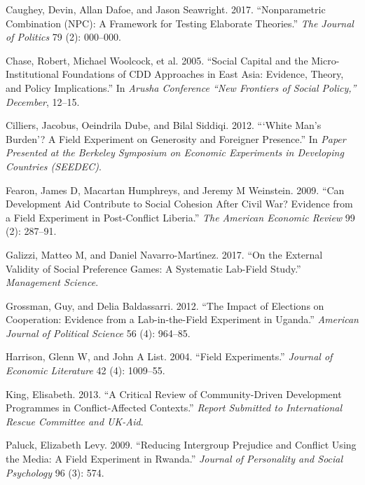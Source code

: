 \documentclass[
]{article}
\newlength{\cslhangindent}
\newlength{\cslentryspacingunit} %
\newenvironment{CSLReferences}[2] %
 {%
  \setlength{\parindent}{0pt}
  \ifodd #1
  \let\oldpar\par
  \def\par{\hangindent=\cslhangindent\oldpar}
  \fi
  \setlength{\parskip}{#2\cslentryspacingunit}
 }%
 {}
\begin{document}
\hypertarget{refs}{}
\begin{CSLReferences}{1}{0}
\leavevmode{}%
Caughey, Devin, Allan Dafoe, and Jason Seawright. 2017. {``Nonparametric
Combination (NPC): A Framework for Testing Elaborate Theories.''}
\emph{The Journal of Politics} 79 (2): 000--000.

\leavevmode{}%
Chase, Robert, Michael Woolcock, et al. 2005. {``Social Capital and the
Micro-Institutional Foundations of CDD Approaches in East Asia:
Evidence, Theory, and Policy Implications.''} In \emph{Arusha Conference
{``New Frontiers of Social Policy,''} December}, 12--15.

\leavevmode{}%
Cilliers, Jacobus, Oeindrila Dube, and Bilal Siddiqi. 2012. {``{`White
Man's Burden'}? A Field Experiment on Generosity and Foreigner
Presence.''} In \emph{Paper Presented at the Berkeley Symposium on
Economic Experiments in Developing Countries (SEEDEC)}.

\leavevmode{}%
Fearon, James D, Macartan Humphreys, and Jeremy M Weinstein. 2009.
{``Can Development Aid Contribute to Social Cohesion After Civil War?
Evidence from a Field Experiment in Post-Conflict Liberia.''} \emph{The
American Economic Review} 99 (2): 287--91.

\leavevmode{}%
Galizzi, Matteo M, and Daniel Navarro-Martı́nez. 2017. {``On the External
Validity of Social Preference Games: A Systematic Lab-Field Study.''}
\emph{Management Science}.

\leavevmode{}%
Grossman, Guy, and Delia Baldassarri. 2012. {``The Impact of Elections
on Cooperation: Evidence from a Lab-in-the-Field Experiment in
Uganda.''} \emph{American Journal of Political Science} 56 (4): 964--85.

\leavevmode{}%
Harrison, Glenn W, and John A List. 2004. {``Field Experiments.''}
\emph{Journal of Economic Literature} 42 (4): 1009--55.

\leavevmode{}%
King, Elisabeth. 2013. {``A Critical Review of Community-Driven
Development Programmes in Conflict-Affected Contexts.''} \emph{Report
Submitted to International Rescue Committee and UK-Aid}.

\leavevmode{}%
Paluck, Elizabeth Levy. 2009. {``Reducing Intergroup Prejudice and
Conflict Using the Media: A Field Experiment in Rwanda.''} \emph{Journal
of Personality and Social Psychology} 96 (3): 574.


\end{CSLReferences}
\end{document}
